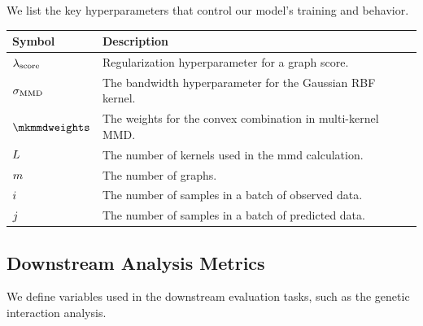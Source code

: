 We list the key hyperparameters that control our model's training and behavior.

\begin{table}[H]
\begin{tabularx}{\textwidth}{l X}
\toprule
\textbf{Symbol} & \textbf{Description} \\
\midrule
$\lambda_{\text{score}}$ & Regularization hyperparameter for a graph score. \\
$\sigma_{\text{MMD}}$ & The bandwidth hyperparameter for the Gaussian RBF kernel. \\
$\mkmmdweights$ & The weights for the convex combination in multi-kernel MMD. \\
$L$ & The number of kernels used in the \gls{mmd} calculation. \\
$m$ & The number of graphs. \\
$i$ & The number of samples in a batch of observed data. \\
$j$ & The number of samples in a batch of predicted data. \\
\bottomrule
\end{tabularx}
\end{table}

\subsection{Downstream Analysis Metrics}
\label{app:nomenclature:downstream_metrics}

We define variables used in the downstream evaluation tasks, such as the genetic interaction analysis.

